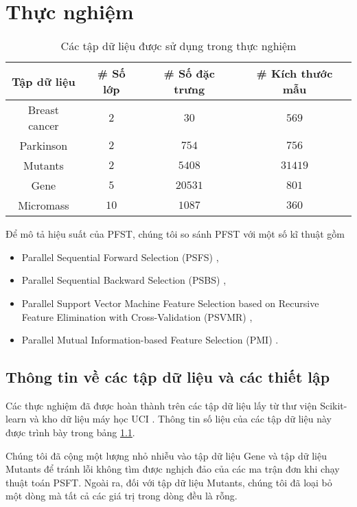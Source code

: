 \chapter{Thực nghiệm}\label{exper}
\begin{table}[htbp]
	\caption{Các tập dữ liệu được sử dụng trong thực nghiệm}
	\begin{center}
		\begin{tabular}{|c|c|c|c|}
			\hline
			Tập dữ liệu & \# Số lớp & \# Số đặc trưng & \# Kích thước mẫu \\
			\hline
			Breast cancer & $2$ & $30$ & $569$ \\
			\hline
			Parkinson & $2$ & $754$ & $756$ \\
			\hline
			Mutants & $2$  & $5408$ & $31419$\\
			\hline
			Gene & $5$ & $20531$ & $801$ \\
			\hline
			Micromass & $10$ & $1087$ & $360$\\
			\hline
		\end{tabular}
		\label{table_info_datasets}
	\end{center}
\end{table}

Để mô tả hiệu suất của PFST, chúng tôi so sánh PFST với một số kĩ thuật gồm
\begin{itemize}
	\item Parallel Sequential Forward Selection (PSFS) \cite{scikit-learn},
	\item Parallel Sequential Backward Selection (PSBS) \cite{scikit-learn},
	\item Parallel Support Vector Machine Feature Selection based on Recursive Feature Elimination with Cross-Validation (PSVMR) \cite{guyon2002gene},
	\item Parallel Mutual Information-based Feature Selection (PMI) \cite{bennasar2015feature}.
\end{itemize}

\section{Thông tin về các tập dữ liệu và các thiết lập}
Các thực nghiệm đã được hoàn thành trên các tập dữ liệu lấy từ thư viện Scikit-learn \cite{scikit-learn} và kho dữ liệu máy học UCI \cite{Dua:2019}. Thông tin số liệu của các tập dữ liệu này được trình bày trong bảng \ref{table_info_datasets}.

Chúng tôi đã cộng một lượng nhỏ nhiễu vào tập dữ liệu Gene và tập dữ liệu Mutants để tránh lỗi không tìm được nghịch đảo của các ma trận đơn khi chạy thuật toán PSFT. Ngoài ra, đối với tập dữ liệu Mutants, chúng tôi đã loại bỏ một dòng mà tất cả các giá trị trong dòng đều là rỗng. 

